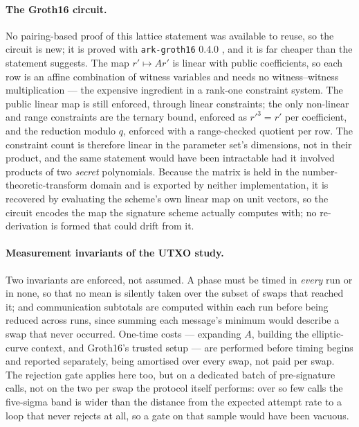 \paragraph{The Groth16 circuit.}
No pairing-based proof of this lattice statement was available to reuse, so the
circuit is new; it is proved with \texttt{ark-groth16} 0.4.0 \cite{arkworks}, and it is far cheaper than the statement suggests. The map
$r' \mapsto A r'$ is linear with public coefficients, so each row is an affine
combination of witness variables and needs no witness--witness multiplication --- the
expensive ingredient in a rank-one constraint system. The public linear map is still
enforced, through linear constraints; the only non-linear and range constraints are
the ternary bound, enforced as $r'^3 = r'$ per coefficient, and the reduction modulo
$q$, enforced with a range-checked quotient per row. The constraint count is therefore
linear in the parameter set's dimensions, not in their product, and the same
statement would have been intractable had it involved products of two \emph{secret}
polynomials. Because the
matrix is held in the number-theoretic-transform domain and is exported by neither
implementation, it is recovered by evaluating the scheme's own linear map on unit
vectors, so the circuit encodes the map the signature scheme actually computes with; no re-derivation is formed that could drift from it.

\paragraph{Measurement invariants of the UTXO study.}
Two invariants are enforced, not assumed. A phase must be timed in \emph{every}
run or in none, so that no mean is silently taken over the subset of swaps that
reached it; and communication subtotals are computed within each run before being
reduced across runs, since summing each message's minimum would describe a swap that
never occurred. One-time costs --- expanding $A$, building the elliptic-curve context,
and Groth16's trusted setup --- are performed before timing begins and reported
separately, being amortised over every swap, not paid per swap. The rejection
gate applies here too, but on a dedicated batch of \cfgTwoRejCalls{} pre-signature
calls, not on the two per swap the protocol itself performs: over so few calls
the five-sigma band is wider than the distance from the expected attempt rate to a
loop that never rejects at all, so a gate on that sample would have been vacuous.


